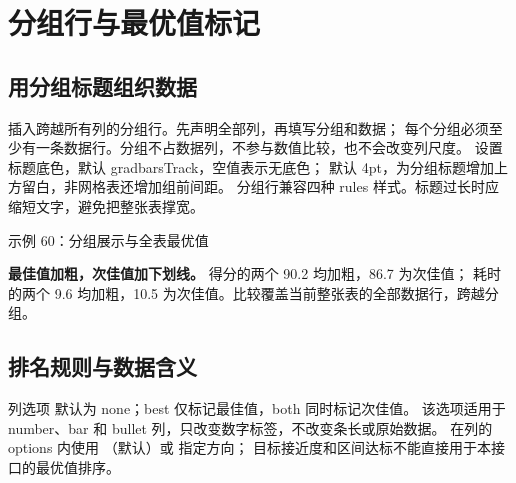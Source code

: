 \section{分组行与最优值标记}
\subsection{用分组标题组织数据}
 插入跨越所有列的分组行。先声明全部列，再填写分组和数据；
每个分组必须至少有一条数据行。分组不占数据列，不参与数值比较，也不会改变列尺度。
 设置标题底色，默认 gradbarsTrack，空值表示无底色；
 默认 4pt，为分组标题增加上方留白，非网格表还增加组前间距。
分组行兼容四种 rules 样式。标题过长时应缩短文字，避免把整张表撑宽。

\begin{example}[text and listing,sidebyside=false]{示例 60：分组展示与全表最优值}
\begin{center}
\begin{gradtable}[align=c,header align=c,text width=30mm,
  graphic width=38mm,label width=12mm,group sep=4pt]
\end{gradtable}
\end{center}
\end{example}
\textbf{最佳值加粗，次佳值加下划线。} 得分的两个 90.2 均加粗，86.7 为次佳值；
耗时的两个 9.6 均加粗，10.5 为次佳值。比较覆盖当前整张表的全部数据行，跨越分组。

\clearpage
\subsection{排名规则与数据含义}
列选项  默认为 none；best 仅标记最佳值，both 同时标记次佳值。
该选项适用于 number、bar 和 bullet 列，只改变数字标签，不改变条长或原始数据。
在列的 options 内使用 （默认）或  指定方向；
目标接近度和区间达标不能直接用于本接口的最优值排序。

